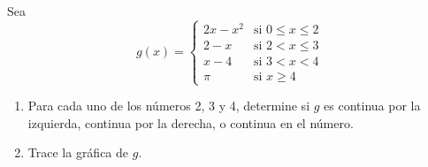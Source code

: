 \item Sea
    $$g(x) = \begin{cases} 
    2x - x^2 & \text{si } 0 \le x \le 2 \\ 
    2 - x & \text{si } 2 < x \le 3 \\ 
    x - 4 & \text{si } 3 < x < 4 \\ 
    \pi & \text{si } x \ge 4 
    \end{cases}$$
    \begin{enumerate}
        \item Para cada uno de los números 2, 3 y 4, determine si $g$ es continua por la izquierda, continua por la derecha, o continua en el número.
        \item Trace la gráfica de $g$.
    \end{enumerate}
